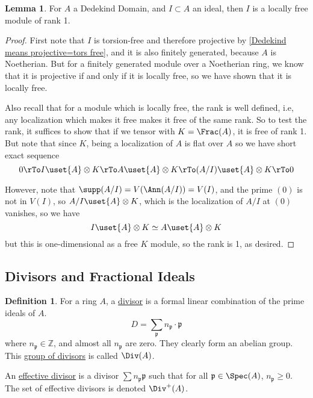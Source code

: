 \documentclass[12 pt]{article}
\theoremstyle{definition}
\newtheorem{lemma}[thm]{Lemma}
\newtheorem{defn}[thm]{Definition}
\renewcommand{\(}{\left(}
\renewcommand{\)}{\right)}
\newcommand\zz{\mathbb{Z}}
\newcommand\fp{{\mathfrak p}}
\begin{document}
\begin{lemma} For $A$ a Dedekind Domain, and $I \subset A$ an ideal, then $I$ is a locally free module of rank 1.
\end{lemma}
\begin{proof}
First note that $I$ is torsion-free and therefore projective by \ref{Dedekind means projective=tors free}, and it is also finitely generated, because $A$ is Noetherian. But for a finitely generated module over a Noetherian ring, we know that it is projective if and only if it is locally free, so we have shown that it is locally free.

Also recall that for a module which is locally free, the rank is well defined, i.e, any localization which makes it free makes it free of the same rank. So to test the rank, it suffices to show that if we tensor with $K=\Frac(A)$, it is free of rank 1. But note that since $K$, being a localization of $A$ is flat over $A$ so we have short exact sequence
\[0 \rTo I \uset{A}\otimes K \rTo A \uset{A}\otimes K \rTo (A/I) \uset{A}\otimes K \rTo 0\]

However, note that $\supp(A/I)=V(\Ann(A/I))=V(I)$, and the prime $(0)$ is not in $V(I)$, so $A/I \uset{A}\otimes K$, which is the localization of $A/I$ at $(0)$ vanishes, so we have
\[I \uset{A}\otimes K \simeq A \uset{A}\otimes K\]
but this is one-dimensional as a free $K$ module, so the rank is 1, as desired.
\end{proof}




\subsection{Divisors and Fractional Ideals}

\begin{defn} For a ring $A$, a \uline{divisor} is a formal linear combination of the prime ideals of $A$.
\[D=\sum_{\fp} n_{\fp} \cdot \fp\]
where $n_{\fp} \in \zz$, and almost all $n_{\fp}$ are zero. They clearly form an abelian group. This \uline{group of divisors} is called $\Div(A)$.

An \uline{effective divisor} is a divisor $\sum n_{\fp} \fp$ such that for all $\fp \in \Spec(A)$, $n_\fp \geq 0$. The set of effective divisors is denoted $\Div^+(A)$.
\end{defn}
\end{document}
